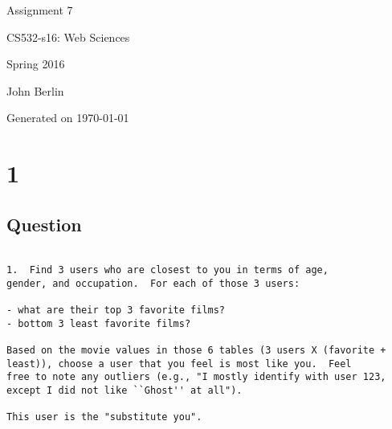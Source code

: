 \documentclass[letterpaper,10pt]{article}
\begin{document}
 

\begin{titlepage}

\begin{center}

\Huge{Assignment 7}

\Large{CS532-s16:  Web Sciences}

\Large{Spring 2016}

\Large{John Berlin}

\Large Generated on \today

\end{center}

\end{titlepage}
\newpage
\section*{1}
\subsection*{Question}
\begin{verbatim}

1.  Find 3 users who are closest to you in terms of age, 
gender, and occupation.  For each of those 3 users:

- what are their top 3 favorite films?
- bottom 3 least favorite films?

Based on the movie values in those 6 tables (3 users X (favorite +
least)), choose a user that you feel is most like you.  Feel 
free to note any outliers (e.g., "I mostly identify with user 123,
except I did not like ``Ghost'' at all").  

This user is the "substitute you".  
\end{verbatim}
\end{document}

